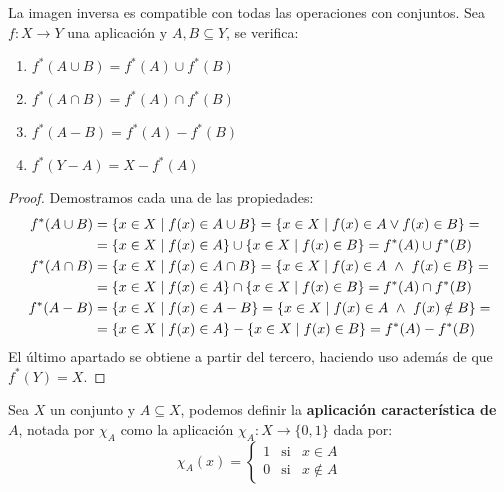 \begin{prop}
    La imagen inversa es compatible con todas las operaciones con conjuntos. Sea $f:X\rightarrow Y$ una aplicación y $A,B\subseteq Y$, se verifica:
    \begin{enumerate}
        \item $f^*(A \cup B) = f^*(A) \cup f^*(B)$
        \item $f^*(A\cap B) = f^*(A)\cap f^*(B)$
        \item $f^*(A - B) = f^*(A) - f^*(B)$
        \item $f^*(Y - A) = X - f^*(A)$
    \end{enumerate}
\end{prop}
\begin{proof}
    Demostramos cada una de las propiedades:
    \begin{align*}
        f^*(A \cup B) &= \{x \in X \mid f(x) \in A \cup B\} = \{x \in X \mid f(x) \in A \vee f(x) \in B\} =\\&= \{x \in X \mid f(x) \in A\} \cup \{x \in X \mid f(x) \in B\} = f^*(A) \cup f^*(B)\\
        f^*(A \cap B) &= \{x \in X \mid f(x) \in A \cap B\} = \{x \in X \mid f(x) \in A \ \land \  f(x) \in B\} =\\&= \{x \in X \mid f(x) \in A\} \cap \{x \in X \mid f(x) \in B\} = f^*(A) \cap f^*(B)\\
        f^*(A - B) &= \{x \in X \mid f(x) \in A - B\} = \{x \in X \mid f(x) \in A \ \land \  f(x) \notin B\} =\\&= \{x \in X \mid f(x) \in A\} - \{x \in X \mid f(x) \in B\} = f^*(A) - f^*(B)
    \end{align*}
    El último apartado se obtiene a partir del tercero, haciendo uso además de que $f^*(Y)=X$.
\end{proof}

\begin{definicion}
    Sea $X$ un conjunto y $A\subseteq X$, podemos definir la \textbf{aplicación característica de $A$}, notada por $\chi_A$ como la aplicación $\chi_A:X\rightarrow \{0,1\}$ dada por:
    \begin{equation*}
        \chi_A(x) = \left\{\begin{array}{lcl}
                1 & \text{si} & x\in A \\
                0 & \text{si} & x\notin A
        \end{array}\right.
    \end{equation*}
\end{definicion}


